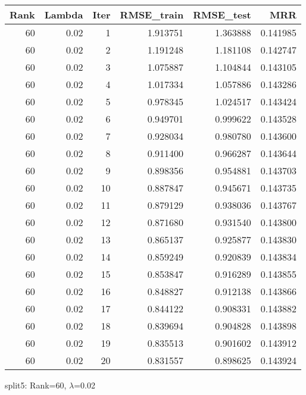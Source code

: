 \begin{tabular}{rrrrrr}
\toprule
 Rank &  Lambda &  Iter &  RMSE\_train &  RMSE\_test &       MRR \\
\midrule
   60 &    0.02 &     1 &    1.913751 &   1.363888 &  0.141985 \\
   60 &    0.02 &     2 &    1.191248 &   1.181108 &  0.142747 \\
   60 &    0.02 &     3 &    1.075887 &   1.104844 &  0.143105 \\
   60 &    0.02 &     4 &    1.017334 &   1.057886 &  0.143286 \\
   60 &    0.02 &     5 &    0.978345 &   1.024517 &  0.143424 \\
   60 &    0.02 &     6 &    0.949701 &   0.999622 &  0.143528 \\
   60 &    0.02 &     7 &    0.928034 &   0.980780 &  0.143600 \\
   60 &    0.02 &     8 &    0.911400 &   0.966287 &  0.143644 \\
   60 &    0.02 &     9 &    0.898356 &   0.954881 &  0.143703 \\
   60 &    0.02 &    10 &    0.887847 &   0.945671 &  0.143735 \\
   60 &    0.02 &    11 &    0.879129 &   0.938036 &  0.143767 \\
   60 &    0.02 &    12 &    0.871680 &   0.931540 &  0.143800 \\
   60 &    0.02 &    13 &    0.865137 &   0.925877 &  0.143830 \\
   60 &    0.02 &    14 &    0.859249 &   0.920839 &  0.143834 \\
   60 &    0.02 &    15 &    0.853847 &   0.916289 &  0.143855 \\
   60 &    0.02 &    16 &    0.848827 &   0.912138 &  0.143866 \\
   60 &    0.02 &    17 &    0.844122 &   0.908331 &  0.143882 \\
   60 &    0.02 &    18 &    0.839694 &   0.904828 &  0.143898 \\
   60 &    0.02 &    19 &    0.835513 &   0.901602 &  0.143912 \\
   60 &    0.02 &    20 &    0.831557 &   0.898625 &  0.143924 \\
\bottomrule
\end{tabular}

\caption{split5: Rank=60, $\lambda$=0.02}
